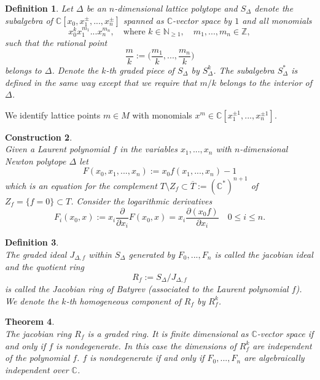\documentclass[12pt, english]{article}
\newtheorem{definition}{Definition}[section]
\newtheorem{theorem}[definition]{Theorem}
\newtheorem{construction}[definition]{Construction}
\begin{document}
\begin{definition}
	Let $\Delta$ be an $n$-dimensional lattice polytope and $S_{\Delta}$ denote the subalgebra of $\mathbb{C}[x_{0},x_{1}^{\pm},...,x_{n}^{\pm}]$  spanned as $\mathbb{C}$-vector space by $1$ and all monomials 
	\[  x_{0}^{k}x_1^{m_1}...x_{n}^{m_{n}}, \quad \textrm{where } k \in \mathbb{N}_{\geq 1},  \quad m_1,...,m_n \in \mathbb{Z}, \]
	such that the rational point
	\[ \frac{m}{k} := \Big( \frac{m_{1}}{k},...,\frac{m_{n}}{k} \Big) \]
	belongs to $\Delta$. Denote the $k$-th graded piece of $S_{\Delta}$ by $S_{\Delta}^k$.	The subalgebra $S_{\Delta}^*$ is defined in the same way except that we require that $m/k$ belongs to the interior of $\Delta$.
\end{definition}





We identify lattice points $m \in M$ with monomials $x^m \in \mathbb{C}[x_1^{\pm 1},...,x_n^{\pm 1}]$.


\begin{construction} \label{construction_Laurent_polynomials_F_i} \cite{Bat93} \\
	\normalfont
	Given a Laurent polynomial $f$ in the variables $x_1,...,x_n$ with $n$-dimensional Newton polytope $\Delta$ let
	\[ F(x_{0},x_{1},...,x_{n}) := x_{0}f(x_1,...,x_n) - 1  \]
	which is an equation for the complement $T \setminus Z_{f} \subset \overline{T}:= (\mathbb{C}^{*})^{n+1}$ of $Z_f=\{f=0\} \subset T$. Consider the logarithmic derivatives 
	\[ F_{i}(x_{0},x) := x_{i}\frac{\partial}{\partial x_{i}} F(x_{0},x) = x_i \frac{\partial (x_0 f)}{\partial x_i} \quad 0 \leq i \leq n. \]
\end{construction}
\begin{definition} \cite{Bat93} \\
	\normalfont
	The graded ideal $J_{\Delta,f}$ within $S_{\Delta}$ generated by $F_{0},...,F_{n}$ is called the \textit{jacobian ideal} and the quotient ring
	\[ R_{f} := S_{\Delta}/J_{\Delta,f} \]
	is called the \textit{Jacobian ring of Batyrev} (associated to the Laurent polynomial $f$). We denote the $k$-th homogeneous component of $R_{f}$ by $R_{f}^k$.
\end{definition}

\begin{theorem} \label{theorem_characterization_Delta_regular} \cite[Thm.4.8]{Bat93} \\
	The jacobian ring $R_{f}$ is a graded ring. It is finite dimensional as $\mathbb{C}$-vector space if and only if $f$ is nondegenerate. In this case the dimensions of $R_f^k$ are independent of the polynomial $f$. $f$ is nondegenerate if and only if $F_0,...,F_n$ are algebraically independent over $\mathbb{C}$.%
\end{theorem}
\end{document}
